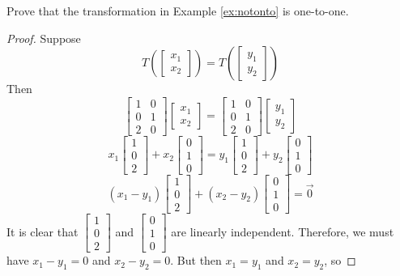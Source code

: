 \documentclass{ximera}
\begin{document}
\begin{example}
Prove that the transformation in Example \ref{ex:notonto} is one-to-one.
\begin{proof}
Suppose
$$T\left(\begin{bmatrix}x_1\\x_2\end{bmatrix}\right)=T\left(\begin{bmatrix}y_1\\y_2\end{bmatrix}\right)$$
Then
$$\begin{bmatrix}1&0\\0&1\\2&0\end{bmatrix}\begin{bmatrix}x_1\\x_2\end{bmatrix}=\begin{bmatrix}1&0\\0&1\\2&0\end{bmatrix}\begin{bmatrix}y_1\\y_2\end{bmatrix}$$
$$x_1\begin{bmatrix}1\\0\\2\end{bmatrix}+x_2\begin{bmatrix}0\\1\\0\end{bmatrix}=y_1\begin{bmatrix}1\\0\\2\end{bmatrix}+y_2\begin{bmatrix}0\\1\\0\end{bmatrix}$$
$$(x_1-y_1)\begin{bmatrix}1\\0\\2\end{bmatrix}+(x_2-y_2)\begin{bmatrix}0\\1\\0\end{bmatrix}=\vec{0}$$
It is clear that $\begin{bmatrix}1\\0\\2\end{bmatrix}$ and $\begin{bmatrix}0\\1\\0\end{bmatrix}$ are linearly independent.  Therefore, we must have $x_1-y_1=0$ and $x_2-y_2=0$.  But then $x_1=y_1$ and $x_2=y_2$, so 

\end{proof}
\end{example}
\end{document}
